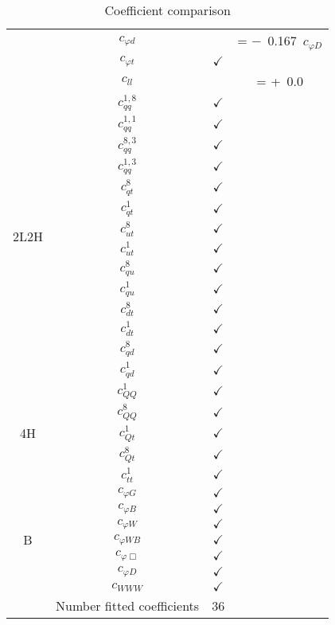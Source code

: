 \documentclass{article}
\begin{document}
\begin{table}[H]
\begin{tabular}{|c|c|c|c|}
 & $c_{\varphi d}$ & & = $-$\ 0.167\ $c_{\varphi D}$\\ \cline{2-4}
 & $c_{\varphi t}$ & $\checkmark$ & \\ \cline{2-4}
 & $c_{ll}$ & & = +\ 0.0
\\ \hline
\multirow{14}{*}{2L2H}
 & $c_{qq}^{1,8}$ & $\checkmark$ & \\ \cline{2-4}
 & $c_{qq}^{1,1}$ & $\checkmark$ & \\ \cline{2-4}
 & $c_{qq}^{8,3}$ & $\checkmark$ & \\ \cline{2-4}
 & $c_{qq}^{1,3}$ & $\checkmark$ & \\ \cline{2-4}
 & $c_{qt}^{8}$ & $\checkmark$ & \\ \cline{2-4}
 & $c_{qt}^{1}$ & $\checkmark$ & \\ \cline{2-4}
 & $c_{ut}^{8}$ & $\checkmark$ & \\ \cline{2-4}
 & $c_{ut}^{1}$ & $\checkmark$ & \\ \cline{2-4}
 & $c_{qu}^{8}$ & $\checkmark$ & \\ \cline{2-4}
 & $c_{qu}^{1}$ & $\checkmark$ & \\ \cline{2-4}
 & $c_{dt}^{8}$ & $\checkmark$ & \\ \cline{2-4}
 & $c_{dt}^{1}$ & $\checkmark$ & \\ \cline{2-4}
 & $c_{qd}^{8}$ & $\checkmark$ & \\ \cline{2-4}
 & $c_{qd}^{1}$ & $\checkmark$ &
\\ \hline
\multirow{5}{*}{4H}
 & $c_{QQ}^{1}$ & $\checkmark$ & \\ \cline{2-4}
 & $c_{QQ}^{8}$ & $\checkmark$ & \\ \cline{2-4}
 & $c_{Qt}^{1}$ & $\checkmark$ & \\ \cline{2-4}
 & $c_{Qt}^{8}$ & $\checkmark$ & \\ \cline{2-4}
 & $c_{tt}^{1}$ & $\checkmark$ &
\\ \hline
\multirow{7}{*}{B}
 & $c_{\varphi G}$ & $\checkmark$ & \\ \cline{2-4}
 & $c_{\varphi B}$ & $\checkmark$ & \\ \cline{2-4}
 & $c_{\varphi W}$ & $\checkmark$ & \\ \cline{2-4}
 & $c_{\varphi WB}$ & $\checkmark$ & \\ \cline{2-4}
 & $c_{\varphi \Box}$ & $\checkmark$ & \\ \cline{2-4}
 & $c_{\varphi D}$ & $\checkmark$ & \\ \cline{2-4}
 & $c_{WWW}$ & $\checkmark$ &
\\ \hline
\hline & Number fitted coefficients & 36 &  \\ \hline
\end{tabular}
\caption{Coefficient comparison}
\end{table}
\end{document}
